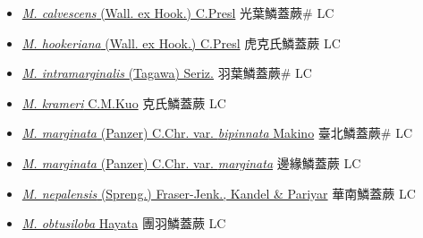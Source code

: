 \begin{itemize}
  \begin{itemize}
        \item[] \href{http://www.theplantlist.org/tpl1.1/search?q=Microlepia+calvescens}{\textit{M. calvescens} (Wall. ex Hook.) C.Presl}   光葉鱗蓋蕨\# LC
        \item[] \href{http://www.theplantlist.org/tpl1.1/search?q=Microlepia+hookeriana}{\textit{M. hookeriana} (Wall. ex Hook.) C.Presl}   虎克氏鱗蓋蕨 LC
        \item[] \href{http://www.theplantlist.org/tpl1.1/search?q=Microlepia+intramarginalis}{\textit{M. intramarginalis} (Tagawa) Seriz.}     羽葉鱗蓋蕨\# LC
        \item[] \href{http://www.theplantlist.org/tpl1.1/search?q=Microlepia+krameri}{\textit{M. krameri} C.M.Kuo}   克氏鱗蓋蕨 LC
        \item[] \href{http://www.theplantlist.org/tpl1.1/search?q=Microlepia+marginata+var.+bipinnata}{\textit{M. marginata} (Panzer) C.Chr. var. \textit{bipinnata} Makino}   臺北鱗蓋蕨\# LC
        \item[] \href{http://www.theplantlist.org/tpl1.1/search?q=Microlepia+marginata+var.+marginata}{\textit{M. marginata} (Panzer) C.Chr. var. \textit{marginata}}   邊緣鱗蓋蕨 LC
        \item[] \href{http://www.theplantlist.org/tpl1.1/search?q=Microlepia+nepalensis}{\textit{M. nepalensis} (Spreng.) Fraser-Jenk., Kandel \& Pariyar}   華南鱗蓋蕨 LC
        \item[] \href{http://www.theplantlist.org/tpl1.1/search?q=Microlepia+obtusiloba}{\textit{M. obtusiloba} Hayata}   團羽鱗蓋蕨 LC

\end{itemize}
\end{itemize}
